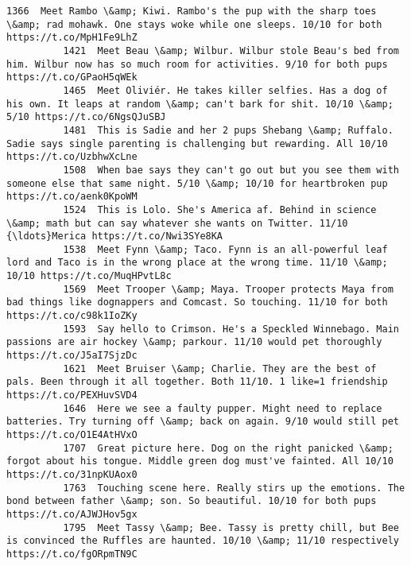 \documentclass[11pt]{article}
\begin{document}
\begin{Verbatim}[commandchars=\\\{\}]
          1366  Meet Rambo \&amp; Kiwi. Rambo's the pup with the sharp toes \&amp; rad mohawk. One stays woke while one sleeps. 10/10 for both https://t.co/MpH1Fe9LhZ                        
          1421  Meet Beau \&amp; Wilbur. Wilbur stole Beau's bed from him. Wilbur now has so much room for activities. 9/10 for both pups https://t.co/GPaoH5qWEk                            
          1465  Meet Oliviér. He takes killer selfies. Has a dog of his own. It leaps at random \&amp; can't bark for shit. 10/10 \&amp; 5/10 https://t.co/6NgsQJuSBJ                         
          1481  This is Sadie and her 2 pups Shebang \&amp; Ruffalo. Sadie says single parenting is challenging but rewarding. All 10/10 https://t.co/UzbhwXcLne                             
          1508  When bae says they can't go out but you see them with someone else that same night. 5/10 \&amp; 10/10 for heartbroken pup https://t.co/aenk0KpoWM                            
          1524  This is Lolo. She's America af. Behind in science \&amp; math but can say whatever she wants on Twitter. 11/10 {\ldots}Merica https://t.co/Nwi3SYe8KA                             
          1538  Meet Fynn \&amp; Taco. Fynn is an all-powerful leaf lord and Taco is in the wrong place at the wrong time. 11/10 \&amp; 10/10 https://t.co/MuqHPvtL8c                         
          1569  Meet Trooper \&amp; Maya. Trooper protects Maya from bad things like dognappers and Comcast. So touching. 11/10 for both https://t.co/c98k1IoZKy                             
          1593  Say hello to Crimson. He's a Speckled Winnebago. Main passions are air hockey \&amp; parkour. 11/10 would pet thoroughly https://t.co/J5aI7SjzDc                             
          1621  Meet Bruiser \&amp; Charlie. They are the best of pals. Been through it all together. Both 11/10. 1 like=1 friendship https://t.co/PEXHuvSVD4                                
          1646  Here we see a faulty pupper. Might need to replace batteries. Try turning off \&amp; back on again. 9/10 would still pet https://t.co/O1E4AtHVxO                             
          1707  Great picture here. Dog on the right panicked \&amp; forgot about his tongue. Middle green dog must've fainted. All 10/10 https://t.co/31npKUAox0                            
          1763  Touching scene here. Really stirs up the emotions. The bond between father \&amp; son. So beautiful. 10/10 for both pups https://t.co/AJWJHov5gx                             
          1795  Meet Tassy \&amp; Bee. Tassy is pretty chill, but Bee is convinced the Ruffles are haunted. 10/10 \&amp; 11/10 respectively https://t.co/fgORpmTN9C                           

\end{Verbatim}
\end{document}
